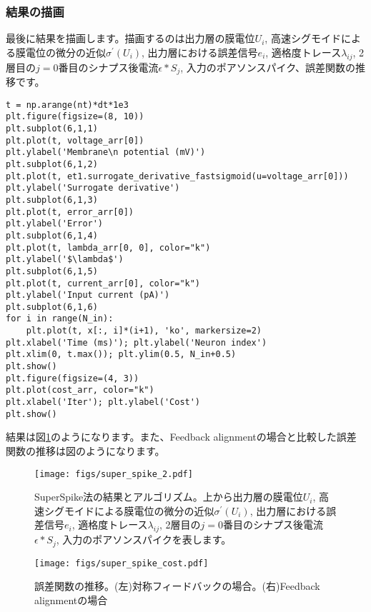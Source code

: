 \subsubsection{結果の描画}
最後に結果を描画します。描画するのは出力層の膜電位$U_i$, 高速シグモイドによる膜電位の微分の近似$\sigma^\prime (U_i)$, 出力層における誤差信号$e_i$, 適格度トレース$\lambda_{ij}$, 2層目の$j=0$番目のシナプス後電流$\epsilon * S_j$, 入力のポアソンスパイク、誤差関数の推移です。
\begin{verbatim}
t = np.arange(nt)*dt*1e3
plt.figure(figsize=(8, 10))
plt.subplot(6,1,1)
plt.plot(t, voltage_arr[0])
plt.ylabel('Membrane\n potential (mV)')
plt.subplot(6,1,2)
plt.plot(t, et1.surrogate_derivative_fastsigmoid(u=voltage_arr[0]))
plt.ylabel('Surrogate derivative')
plt.subplot(6,1,3)
plt.plot(t, error_arr[0])
plt.ylabel('Error')
plt.subplot(6,1,4)
plt.plot(t, lambda_arr[0, 0], color="k")
plt.ylabel('$\lambda$')
plt.subplot(6,1,5)
plt.plot(t, current_arr[0], color="k")
plt.ylabel('Input current (pA)')
plt.subplot(6,1,6)
for i in range(N_in):    
    plt.plot(t, x[:, i]*(i+1), 'ko', markersize=2)
plt.xlabel('Time (ms)'); plt.ylabel('Neuron index') 
plt.xlim(0, t.max()); plt.ylim(0.5, N_in+0.5)
plt.show()
plt.figure(figsize=(4, 3))
plt.plot(cost_arr, color="k")
plt.xlabel('Iter'); plt.ylabel('Cost') 
plt.show()
\end{verbatim}
結果は図\ref{fig:super_spike}のようになります。また、Feedback alignmentの場合と比較した誤差関数の推移は図のようになります。
\begin{figure}[htbp]
    \centering
    \texttt{[image: figs/super\_spike\_2.pdf]}
    \caption{SuperSpike法の結果とアルゴリズム。上から出力層の膜電位$U_i$, 高速シグモイドによる膜電位の微分の近似$\sigma^\prime (U_i)$, 出力層における誤差信号$e_i$, 適格度トレース$\lambda_{ij}$, 2層目の$j=0$番目のシナプス後電流$\epsilon * S_j$, 入力のポアソンスパイクを表します。}
    \label{fig:super_spike}
\end{figure}
\begin{figure}[htbp]
    \centering
    \texttt{[image: figs/super\_spike\_cost.pdf]}
    \caption{誤差関数の推移。(左)対称フィードバックの場合。(右)Feedback alignmentの場合}
    \label{fig:super_spike_2}
\end{figure}
